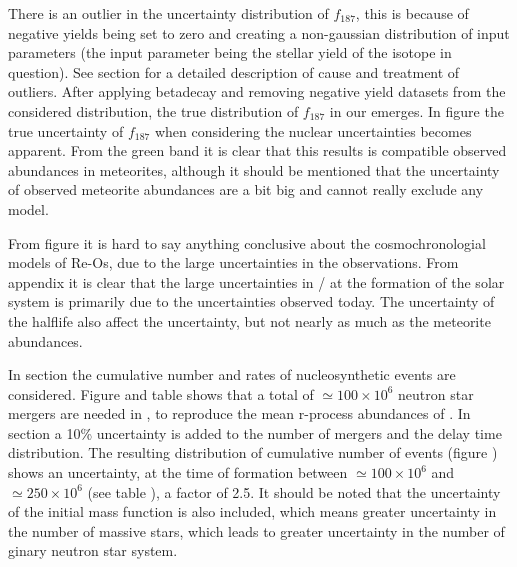 There is an outlier in the uncertainty distribution of $f_{187}$, this is because of negative yields being set to zero and creating a non-gaussian distribution of input parameters (the input parameter being the stellar yield of the isotope in question). See section  for a detailed description of cause and treatment of outliers.
After applying betadecay and removing negative yield datasets from the considered distribution, the true distribution of $f_{187}$ in our  emerges.
In figure  the true uncertainty of $f_{187}$ when considering the nuclear uncertainties becomes apparent.
From the green band it is clear that this results is compatible observed abundances in meteorites, although it should be mentioned that the uncertainty of observed meteorite abundances are a bit big and cannot really exclude any model.

From figure  it is hard to say anything conclusive about the cosmochronologial models of Re-Os, due to the large uncertainties in the observations.
From appendix  it is clear that the large uncertainties in / at the formation of the solar system is primarily due to the uncertainties observed today.
The uncertainty of the  halflife also affect the uncertainty, but not nearly as much as the meteorite abundances.

In section  the cumulative number and rates of nucleosynthetic events are considered.
Figure  and table  shows that a total of $\simeq100\times 10^6$ neutron star mergers are needed in \omegamodel, to reproduce the mean r-process abundances of \eris.
In section  a 10\% uncertainty is added to the number of mergers and the delay time distribution.
The resulting distribution of cumulative number of events (figure ) shows an uncertainty, at the time of \sos formation between $\simeq 100\times 10^{6}$ and $\simeq 250\times 10^{6}$ (see table ), a factor of 2.5.
It should be noted that the uncertainty of the initial mass function is also included, which means greater uncertainty in the number of massive stars, which leads to greater uncertainty in the number of ginary neutron star system.

